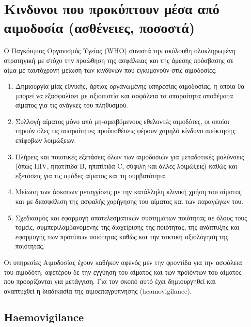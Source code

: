\section{Κινδυνοι που προκύπτουν μέσα από αιμοδοσία (ασθένειες, ποσοστά)}


	Ο Παγκόσμιος Οργανισμός Υγείας (WHO) συνιστά την ακόλουθη ολοκληρωμένη στρατηγική με στόχο την προώθηση της ασφάλειας και της άμεσης πρόσβασης σε αίμα με ταυτόχρονη μείωση των κινδύνων που εγκυμονούν στις αιμοδοσίες:
	\begin{enumerate}
	\item Δημιουργία μίας εθνικής, άρτιας οργανωμένης υπηρεσίας αιμοδοσίας, η οποία θα μπορεί να εξασφαλίσει με αξιοπιστία και ασφάλεια τα απαραίτητα αποθέματα αίματος για τις ανάγκες του πληθυσμού.
	\item Συλλογή αίματος μόνο από μη-αμειβόμενους εθελοντές αιμοδότες, οι οποίοι τηρούν όλες τις απαραίτητες προϋποθέσεις φέρουν χαμηλό κίνδυνο απόκτησης επίφοβων λοιμώξεων.
	\item Πλήρεις και ποιοτικές εξετάσεις όλων των αιμοδοσιών για μεταδοτικές μολύνσεις (όπως HIV, ηπατίτιδα Β, ηπατίτιδα C, σύφιλη και άλλες λοιμώξεις)  καθώς και εξετάσεις για τις ομάδες αίματος και τη συμβατότητα.
	\item Μείωση των άσκοπων μεταγγίσεις με την κατάλληλη κλινική χρήση του αίματος και με διασφάλιση της ασφαλής χορήγησης του αίματος και των παραγώγων του.
	\item Σχεδιασμός και εφαρμογή αποτελεσματικών συστημάτων ποιότητας σε όλους τους τομείς, συμπεριλαμβανομένης της διαχείρισης της ποιότητας, της ανάπτυξης και εφαρμογής των προτύπων ποιότητας καθώς και την τακτική αξιολόγηση της ποιότητας. \cite{Bolton-Maggs2013}
\end{enumerate}

	Οι υπηρεσίες Αιμοδοσίας έχουν καθήκον αφενός μεν την φροντίδα για την ασφάλεια του αιμοδότη, αφετέρου δε την εγγύηση του αίματος και των προϊόντων του αίματος που προορίζονται για μετάγγιση. Για τον σκοπό αυτό έχει δημιουργηθεί και αναπτυχθεί η διαδικασία της αιμοεπαγρυπνησης (heamovigilance).

	\subsection{Haemovigilance}
	
